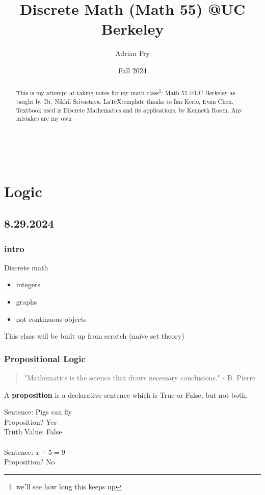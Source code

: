 \documentclass[11pt]{scrartcl}
\begin{document}
\title{Discrete Math (Math 55) @UC Berkeley} %
\author{Adrian Fry}
\date{Fall 2024}
\maketitle
\tableofcontents
{}

\begin{abstract}
    This is my attempt at taking notes for my math class\footnote{we'll see how long this keeps up}: Math 55 @UC Berkeley as taught by Dr. Nikhil Srivastava. \LaTeX  template thanks to Ian Kerio, Evan Chen.  Textbook used is Discrete Mathematics and its applications, by Kenneth Rosen.  Any mistakes are my own
\end{abstract}
\Line \\
\section{Logic}
\subsection{8.29.2024}
\subsubsection{intro}
Discrete math 
\begin{itemize}
    \item integers 
    \item graphs
    \item not continuous objects 
\end{itemize}
This class will be built up from scratch (naive set theory)
\subsubsection{Propositional Logic}
\begin{quote}
    "Mathematics is the science that draws necessary conclusions." - B. Pierre
\end{quote}

\begin{definition}[Proposition]
    A \textbf{proposition} is a declarative sentence which is True or False, but not both.
\end{definition}
\begin{example}
    Sentence: Pigs can fly\\
    Proposition? Yes\\
    Truth Value: False\\\\
    Sentence: $x+5=9$\\ Proposition? No
\end{example}
\end{document}
